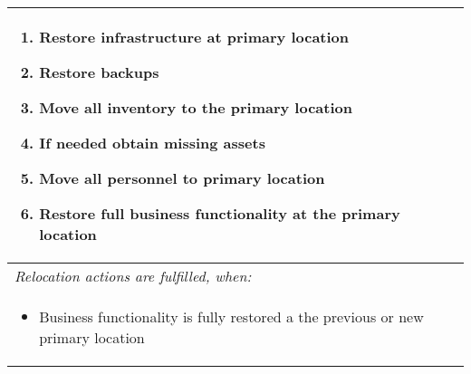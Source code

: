 \begin{longtable}{| p{13cm} |}
\begin{enumerate}
		\item Restore infrastructure at primary location
		\item Restore backups
		\item Move all inventory to the primary location
		\item If needed obtain missing assets
		\item Move all personnel to primary location
		\item Restore full business functionality at the primary location
	\end{enumerate}\\\hline
	\emph{Relocation actions are fulfilled, when:}\\\hline
	\begin{itemize}
		\item Business functionality is fully restored a the previous or new primary location
	\end{itemize}\\\hline
\end{longtable}